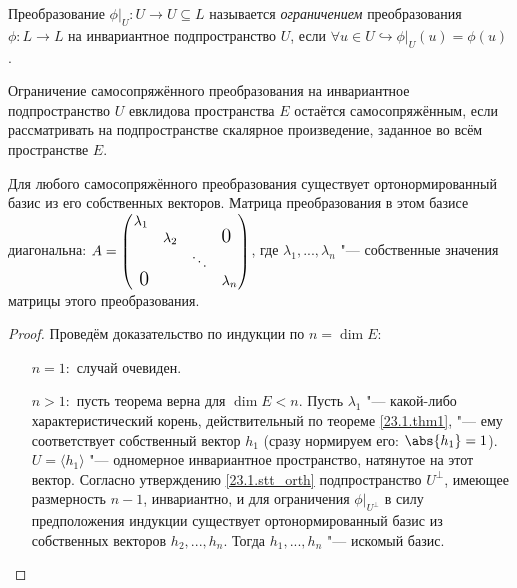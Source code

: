  \begin{defn}
  Преобразование $\phi|_U:U\rightarrow U \subseteq L$ называется \textit{ограничением} преобразования $\phi:L\rightarrow L$ на инвариантное подпространство $U$, если $\forall u \in U \hookrightarrow \phi|_U(u)=\phi(u)$.
  \end{defn}  
  \begin{notion}
  Ограничение самосопряжённого преобразования на инвариантное подпространство $U$ евклидова пространства $E$ остаётся самосопряжённым, если рассматривать на подпространстве скалярное произведение, заданное во всём пространстве $E$.
  \end{notion}  
  
  \begin{thm}
  Для любого самосопряжённого преобразования существует ортонормированный базис из его собственных векторов. Матрица преобразования в этом базисе диагональна: $A=
  \begin{pmatrix}
  \lambda_1 &           &        & \\
            & \lambda_2 &        & \fudge {0 }  \\
            &			& \ddots & \\
  \fudge{ 0}&			&		 & \lambda_n \\
  \end{pmatrix}$, где $\lambda_1,...,\lambda_n$ "--- собственные значения матрицы этого преобразования.
  \end{thm}
  \begin{proof} Проведём доказательство по индукции по $n=\dim E$:
  \linebreak\vspace*{-\baselineskip}
  \begin{itemize}
  \item[\underline{$n=1:$}] случай очевиден.
  \item[\underline{$n>1:$}] пусть теорема верна для $\dim E<n$. Пусть $\lambda_1$ "--- какой-либо характеристический корень, действительный по теореме \ref{23.1.thm1}, "--- ему соответствует собственный вектор $h_1$ (сразу нормируем его: $\abs{h_1}=1$). $U=\langle h_1\rangle$ "--- одномерное инвариантное пространство, натянутое на этот вектор. Согласно утверждению \ref{23.1.stt_orth} подпространство $U^\perp$, имеющее размерность $n-1$, инвариантно, и для ограничения $\phi|_{U^\perp}$ в силу предположения индукции существует ортонормированный базис из собственных векторов $h_2,...,h_n$. Тогда $h_1,...,h_n$ "--- искомый базис.

  \end{itemize}
  \vspace{-1.65\baselineskip}  
  \end{proof}
